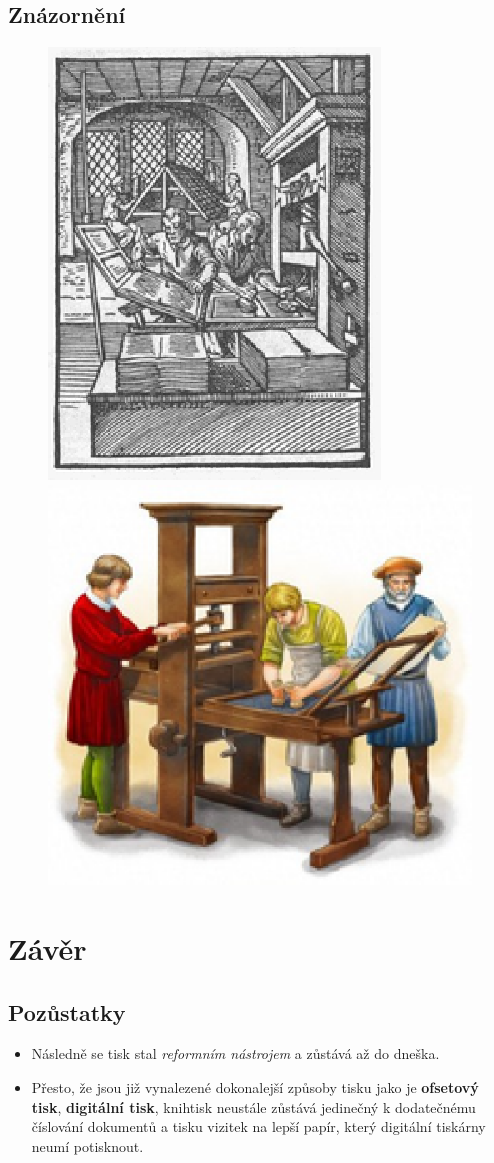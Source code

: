 \documentclass[brown]{beamer}
\begin{document}
\subsection{Znázornění}

\begin{frame}
  \begin{figure}
  	\includegraphics[height = 5 cm]{knihtisk_old.eps}
	\quad \quad
  	\includegraphics[height = 5 cm]{knihtisk.eps}
  \end{figure}
\end{frame}

\section{Závěr}

\subsection{Pozůstatky}

\begin{frame}
  \begin{itemize}
  \frametitle{Časová návaznost}   %
  \item Následně se tisk stal \emph{reformním nástrojem} a zůstává až do dneška.
  \item Přesto, že jsou již vynalezené dokonalejší způsoby tisku jako je \textbf{ofsetový tisk}, \textbf{digitální tisk}, knihtisk neustále zůstává jedinečný k dodatečnému číslování dokumentů a tisku vizitek na lepší papír, který digitální tiskárny neumí potisknout.
  \end{itemize}
\end{frame}
\end{document}
